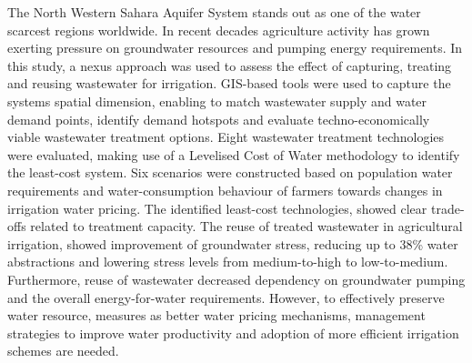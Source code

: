 The North Western Sahara Aquifer System stands out as one of the water scarcest regions worldwide. In recent decades agriculture activity has grown exerting pressure on groundwater resources and pumping energy requirements. In this study, a nexus approach was used to assess the effect of capturing, treating and reusing wastewater for irrigation. GIS-based tools were used to capture the systems spatial dimension, enabling to match wastewater supply and water demand points, identify demand hotspots and evaluate techno-economically viable wastewater treatment options. Eight  wastewater treatment technologies were evaluated, making use of a Levelised Cost of Water methodology to identify the least-cost system. Six scenarios were constructed based on population water requirements and water-consumption behaviour of farmers towards changes in irrigation water pricing. The identified least-cost technologies, showed clear trade-offs related to treatment capacity. The reuse of treated wastewater in agricultural irrigation, showed improvement of groundwater stress, reducing up to 38\% water abstractions and lowering stress levels from medium-to-high to low-to-medium. Furthermore, reuse of wastewater decreased dependency on groundwater pumping and the overall energy-for-water requirements. However, to effectively preserve water resource, measures as better water pricing mechanisms, management strategies to improve water productivity and adoption of more efficient irrigation schemes are needed.